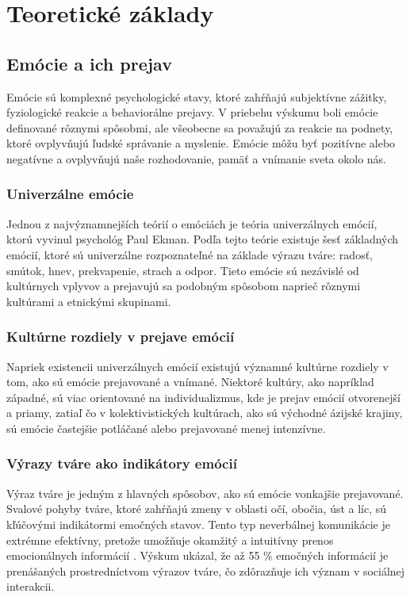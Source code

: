 \section{Teoretické základy}
\subsection{Emócie a ich prejav}
Emócie sú komplexné psychologické stavy, ktoré zahŕňajú subjektívne zážitky, fyziologické reakcie a behaviorálne prejavy. V priebehu výskumu boli emócie definované rôznymi spôsobmi, 
ale všeobecne sa považujú za reakcie na podnety, ktoré ovplyvňujú ľudské správanie a myslenie. Emócie môžu byť pozitívne alebo negatívne a ovplyvňujú naše rozhodovanie, pamäť a vnímanie sveta okolo nás. \cite{article01}
\subsubsection{Univerzálne emócie}
Jednou z najvýznamnejších teórií o emóciách je teória univerzálnych emócií, ktorú vyvinul psychológ Paul Ekman. Podľa tejto teórie existuje šesť základných emócií, ktoré sú univerzálne rozpoznateľné 
na základe výrazu tváre: radosť, smútok, hnev, prekvapenie, strach a odpor​. Tieto emócie sú nezávislé od kultúrnych vplyvov a prejavujú sa podobným spôsobom naprieč rôznymi kultúrami a etnickými skupinami. \cite{article03}
\subsubsection{Kultúrne rozdiely v prejave emócií}
Napriek existencii univerzálnych emócií existujú významné kultúrne rozdiely v tom, ako sú emócie prejavované a vnímané. Niektoré kultúry, ako napríklad západné, sú viac orientované na individualizmus, 
kde je prejav emócií otvorenejší a priamy, zatiaľ čo v kolektivistických kultúrach, ako sú východné ázijské krajiny, sú emócie častejšie potláčané alebo prejavované menej intenzívne​. \cite{article01}
\subsubsection{Výrazy tváre ako indikátory emócií}
Výraz tváre je jedným z hlavných spôsobov, ako sú emócie vonkajšie prejavované. Svalové pohyby tváre, ktoré zahŕňajú zmeny v oblasti očí, obočia, úst a líc, sú kľúčovými indikátormi emočných stavov. 
Tento typ neverbálnej komunikácie je extrémne efektívny, pretože umožňuje okamžitý a intuitívny prenos emocionálnych informácií​ \cite{inProceedings01}. Výskum ukázal, že až 55 \% emočných informácií je 
prenášaných prostredníctvom výrazov tváre, čo zdôrazňuje ich význam v sociálnej interakcii​. \cite{article03}
